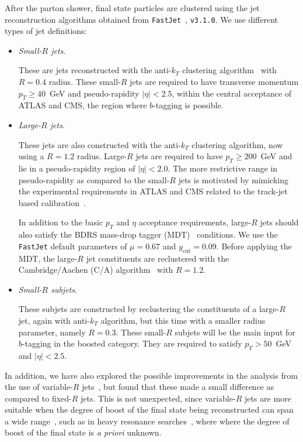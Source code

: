 After the  parton shower, final state particles
are clustered using the
jet reconstruction algorithms
obtained from
{\tt FastJet}~\cite{Cacciari:2011ma,Cacciari:2005hq},
{\tt v3.1.0}.
%
We use different types of jet definitions:
\begin{itemize}
\item {\it Small-$R$ jets}.

  These are jets  reconstructed with the
  anti-$k_T$ clustering algorithm~\cite{Cacciari:2008gp} with $R=0.4$ radius.
  These small-$R$ jets are required
  to have transverse momentum $p_T \ge 40$~GeV
  and pseudo-rapidity $|\eta|<2.5$, within the central 
  acceptance of ATLAS and CMS, the region
  where $b$-tagging is possible.

\item {\it Large-$R$ jets}.

  These jets are also constructed with the
  anti-$k_T$ clustering algorithm, now using a $R=1.2$ radius.
  Large-$R$ jets are required to have
  $p_T \ge 200$~GeV and lie in a pseudo-rapidity region of
  $|\eta|<2.0$.
  The more restrictive range  in pseudo-rapidity
  as compared to the small-$R$ jets
  is motivated by mimicking the  experimental requirements
  in ATLAS and CMS
  related to the track-jet based calibration~\cite{Aad:2014bia,ATLAS:2012kla}.

  In addition to the basic $p_T$ and $\eta$
  acceptance requirements, large-$R$ jets should also
  satisfy the  BDRS mass-drop tagger (MDT)~\cite{Butterworth:2008iy}
  conditions.
  We use the {\tt FastJet} default
  parameters of  $\mu = 0.67$ and $y_{\textrm{cut}}= 0.09$.
  Before applying the MDT, the large-$R$ jet
  constituents are reclustered with the Cambridge/Aachen (C/A)
  algorithm~\cite{Dokshitzer:1997in,Wobisch:1998wt}
  with $R=1.2$.

  
\item {\it Small-$R$ subjets}.

  These subjets are constructed by reclustering the constituents
  of a large-$R$ jet, again with  anti-$k_T$ algorithm,
  but this time with a smaller radius parameter, namely
  $R=0.3$.
  These small-$R$ subjets will be the main input for
  $b$-tagging in the boosted category.
  They are required to satisfy $p_T > 50$~GeV and $|\eta|<2.5$.
\end{itemize}

In addition, we have
also explored the possible improvements
in the analysis from the use
of variable-$R$ jets~\cite{Krohn:2009zg}, but found that these made
a small difference as compared to fixed-$R$ jets.
%
This is not unexpected, since variable-$R$ jets are more suitable when
the degree of boost of the final state being reconstructed can span
a wide range~\cite{Cacciari:2008gd}, such as in heavy resonance searches~\cite{Aad:2015fna},
where where the degree of boost of the final state
is {\it a priori} unknown.


